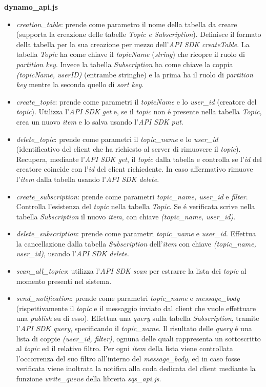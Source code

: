 \documentclass{article}
\begin{document}
\textbf{dynamo\_api.js}
\begin{itemize}
\item{\textit{creation\_table}: prende come parametro il nome della tabella da creare (supporta la creazione delle tabelle \textit{Topic e Subscription}). Definisce il formato della tabella per la sua creazione per mezzo dell'\textit{API SDK createTable}. La tabella \textit{Topic} ha come chiave il \textit{topicName} (\textit{string}) che ricopre il ruolo di \textit{partition key}. Invece la tabella \textit{Subscription} ha come chiave la coppia \textit{(topicName, userID)} (entrambe stringhe) e la prima ha il ruolo di \textit{partition key} mentre la seconda quello di \textit{sort key}.}
\item{\textit{create\_topic}: prende come parametri il \textit{topicName} e lo \textit{user\_id} (creatore del \textit{topic}). Utilizza l'\textit{API SDK get} e, se il \textit{topic} non \'e presente nella tabella \textit{Topic}, crea un nuovo \textit{item} e lo salva usando l'\textit{API SDK put}.}
\item{\textit{delete\_topic}: prende come parametri il \textit{topic\_name} e lo \textit{user\_id} (identificativo del client che ha richiesto al server di rimuovere il \textit{topic}). Recupera, mediante l'\textit{API SDK get}, il \textit{topic} dalla tabella e controlla se l'\textit{id} del creatore coincide con l'\textit{id} del client richiedente. In caso affermativo rimuove l'\textit{item} dalla tabella usando l'\textit{API SDK delete}.}
\item{\textit{create\_subscription}: prende come parametri \textit{topic\_name, user\_id} e \textit{filter}. Controlla l'esistenza del \textit{topic} nella tabella \textit{Topic}. Se \'e verificata scrive nella tabella \textit{Subscription} il nuovo \textit{item}, con chiave \textit{(topic\_name, user\_id)}.}
\item{\textit{delete\_subscription}: prende come parametri \textit{topic\_name} e \textit{user\_id}. Effettua la cancellazione dalla tabella \textit{Subscription} dell'\textit{item} con chiave \textit{(topic\_name, user\_id)}, usando l'\textit{API SDK delete}.}
\item{\textit{scan\_all\_topics}: utilizza l'\textit{API SDK scan} per estrarre la lista dei \textit{topic} al momento presenti nel sistema.}
\item{\textit{send\_notification}: prende come parametri \textit{topic\_name} e \textit{message\_body} (rispettivamente il \textit{topic} e il messaggio inviato dal client che vuole effettuare una \textit{publish} su di esso). Effettua una \textit{query} sulla tabella \textit{Subscription}, tramite l'\textit{API SDK query}, specificando il \textit{topic\_name}. Il risultato delle \textit{query} \'e una lista di coppie \textit{(user\_id, filter)}, ognuna delle quali rappresenta un sottoscritto al \textit{topic} ed il relativo filtro. Per ogni \textit{item} della lista viene controllata l'occorrenza del suo filtro all'interno del \textit{message\_body}, ed in caso fosse verificata viene inoltrata la notifica alla coda dedicata del client mediante la funzione \textit{write\_queue} della libreria \textit{sqs\_api.js}.}
\end{itemize}
\end{document}
